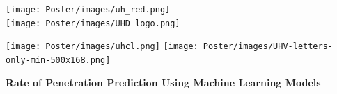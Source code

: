\documentclass{a0poster}
\title{}
\author{}
\date{}
\begin{document}

\begin{center}
  \begin{minipage}{.19\linewidth}
  \begin{minipage}{.36\textwidth}
      \centering
        \texttt{[image: Poster/images/uh\_red.png]}\\
        \vspace{2.5cm}
        \texttt{[image: Poster/images/UHD\_logo.png]}
  \vspace{-1.5cm}
  \end{minipage}
  \begin{minipage}{1\linewidth}
  \begin{minipage}{.5\textwidth}
      \begin{center}
        \texttt{[image: Poster/images/uhcl.png]}
        \texttt{[image: Poster/images/UHV-letters-only-min-500x168.png]}\\
      \end{center}
  \end{minipage}
    \end{minipage}
 \end{minipage}
  \begin{minipage}{.6\linewidth}
    \begin{center}
      \Huge \textbf{Rate of Penetration Prediction Using Machine Learning Models}
      

\end{center}
\end{minipage}
\end{center}
\end{document}
